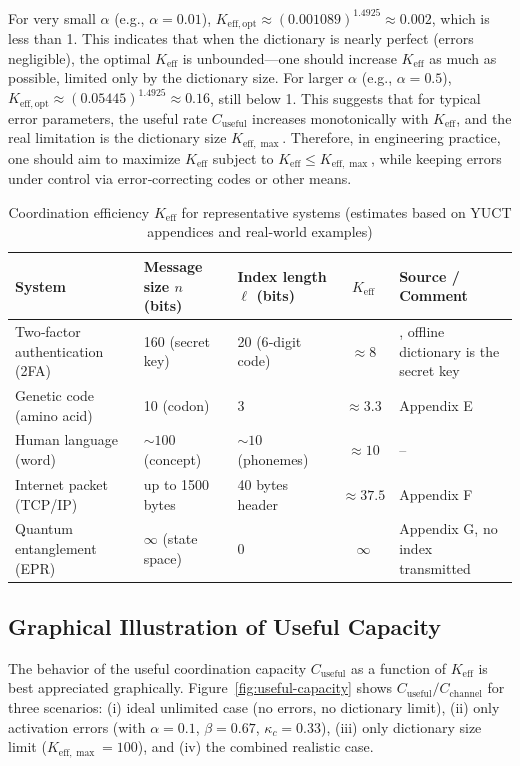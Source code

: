 \documentclass[12pt,a4paper]{article}
\theoremstyle{remark}
\newcommand{\Keff}{K_{\mathrm{eff}}}
\newcommand{\Keffopt}{K_{\mathrm{eff},\mathrm{opt}}}
\newcommand{\Keffmax}{K_{\mathrm{eff},\max}}
\begin{document}
	For very small $\alpha$ (e.g., $\alpha = 0.01$), $\Keffopt \approx (0.001089)^{1.4925} \approx 0.002$, which is less than 1. This indicates that when the dictionary is nearly perfect (errors negligible), the optimal $\Keff$ is unbounded—one should increase $\Keff$ as much as possible, limited only by the dictionary size. For larger $\alpha$ (e.g., $\alpha = 0.5$), $\Keffopt \approx (0.05445)^{1.4925} \approx 0.16$, still below 1. This suggests that for typical error parameters, the useful rate $C_{\text{useful}}$ increases monotonically with $\Keff$, and the real limitation is the dictionary size $\Keffmax$. Therefore, in engineering practice, one should aim to maximize $\Keff$ subject to $\Keff \le \Keffmax$, while keeping errors under control via error‑correcting codes or other means.
	
	
	\begin{table}[htbp]
		\centering
		\caption{Coordination efficiency $\Keff$ for representative systems (estimates based on YUCT appendices and real‑world examples)}
		\label{tab:keff-examples}
		\footnotesize
		\begin{tabularx}{\textwidth}{XXXcX}
			\toprule
			System & Message size $n$ (bits) & Index length $\ell$ (bits) & $\Keff$ & Source / Comment \\
			\midrule
			Two‑factor authentication (2FA) & 160 (secret key) & 20 (6‑digit code) & $\approx 8$ & \cite{Yakushev2026b}, offline dictionary is the secret key \\
			Genetic code (amino acid) & 10 (codon) & 3 & $\approx 3.3$ & Appendix E \\
			Human language (word) & $\sim 100$ (concept) & $\sim 10$ (phonemes) & $\approx 10$ & – \\
			Internet packet (TCP/IP) & up to 1500 bytes & 40 bytes header & $\approx 37.5$ & Appendix F \\
			Quantum entanglement (EPR) & $\infty$ (state space) & 0 & $\infty$ & Appendix G, no index transmitted \\
			\bottomrule
		\end{tabularx}
	\end{table}
	
	\subsection{Graphical Illustration of Useful Capacity}
	\label{sec:graphical}
	
	The behavior of the useful coordination capacity $C_{\text{useful}}$ as a function of $\Keff$ is best appreciated graphically. Figure~\ref{fig:useful-capacity} shows $C_{\text{useful}}/C_{\text{channel}}$ for three scenarios: (i) ideal unlimited case (no errors, no dictionary limit), (ii) only activation errors (with $\alpha=0.1$, $\beta=0.67$, $\kappa_c=0.33$), (iii) only dictionary size limit ($\Keffmax=100$), and (iv) the combined realistic case.
	
\end{document}
